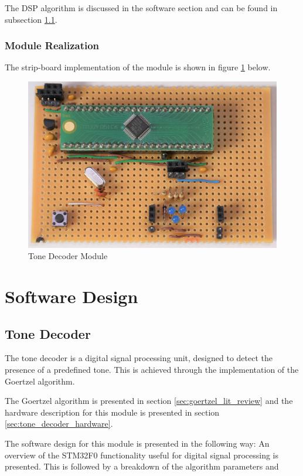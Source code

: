 The DSP algorithm is discussed in the software section and can be found in subsection \ref{tone_decoder_software}.

\subsubsection{Module Realization}
The strip-board implementation of the module is shown in figure \ref{fig:module_tone_decoder} below.

\begin{figure}[H]
	\centering
	\includegraphics[width=.6\textwidth]{figures/modules/goertzel_filter.jpg}
	\caption{Tone Decoder Module}
	\label{fig:module_tone_decoder}
\end{figure}




\section{Software Design}

\subsection{Tone Decoder}
\label{tone_decoder_software}

The tone decoder is a digital signal processing unit, designed to detect the presence of a predefined tone. This is achieved through the implementation of the Goertzel algorithm.

The Goertzel algorithm is presented in section \ref{sec:goertzel_lit_review} and the hardware description for this module is presented in section \ref{sec:tone_decoder_hardware}.

The software design for this module is presented in the following way: %
An overview of the STM32F0 functionality useful for digital signal processing is presented. This is followed by a breakdown of the algorithm parameters and 

